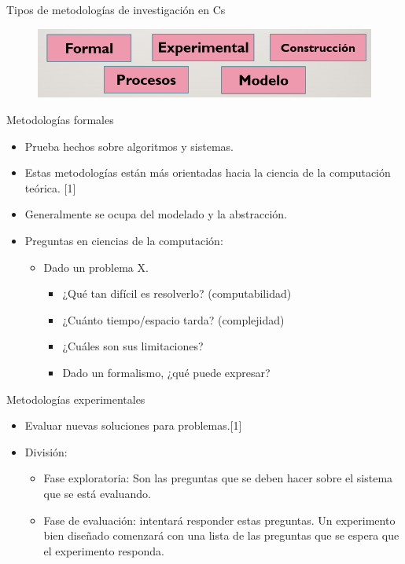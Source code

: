 \begin{frame}{Tipos de metodologías de investigación en Cs}
 \begin{figure}[H]
    \includegraphics[scale=0.58]{images/figura2.PNG}
    \label{fig:boat1}
\end{figure}     
\end{frame}

\begin{frame}{Metodologías formales}
\begin{block}{}
\begin{itemize}
    \item Prueba hechos sobre algoritmos y sistemas. 
    \item Estas metodologías están más orientadas hacia la ciencia de la computación teórica. [1]
    \item Generalmente se ocupa del modelado y la abstracción. 

    \item Preguntas en  ciencias de la computación:
    \begin{itemize}
        \item Dado un problema X.
            \begin{itemize}
        \item ¿Qué tan difícil es resolverlo? (computabilidad)
        \item ¿Cuánto tiempo/espacio tarda? (complejidad)
        \item¿Cuáles son sus limitaciones? 
        \item Dado un formalismo, ¿qué puede expresar?
    \end{itemize}
    \end{itemize}
\end{itemize}
 \end{block} 
\end{frame}


\begin{frame}{Metodologías experimentales}
\begin{block}{}
\begin{itemize}
    \item Evaluar nuevas soluciones para problemas.[1]
    \item División:
    \begin{itemize}
        \item Fase exploratoria: Son las preguntas que se deben hacer sobre el sistema que se está evaluando. 
        \item Fase de evaluación: intentará responder estas preguntas. Un experimento bien diseñado comenzará con una lista de las preguntas que se espera que el experimento responda.
    \end{itemize}
\end{itemize}
 \end{block} 
\end{frame}

